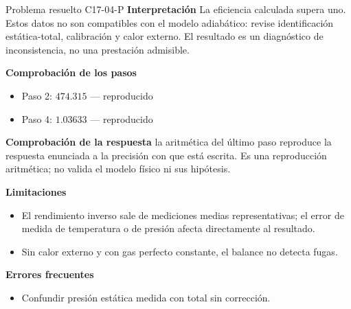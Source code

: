 \documentclass[10pt,openany]{book}
\begin{document}
\begin{studiumworked}{Problema resuelto C17-04-P}
\noindent\textbf{Interpretación}
La eficiencia calculada supera uno. Estos datos no son compatibles con el modelo adiabático: revise identificación estática-total, calibración y calor externo. El resultado es un diagnóstico de inconsistencia, no una prestación admisible.

\noindent\textbf{Comprobación de los pasos}
\begin{itemize}
\item Paso 2: $474.315$ — reproducido
\item Paso 4: $1.03633$ — reproducido
\end{itemize}

\noindent\textbf{Comprobación de la respuesta} la aritmética del último paso reproduce la respuesta enunciada a la precisión con que está escrita. Es una reproducción aritmética; no valida el modelo físico ni sus hipótesis.

\noindent\textbf{Limitaciones}
\begin{itemize}
\item El rendimiento inverso sale de mediciones medias representativas; el error de medida de temperatura o de presión afecta directamente al resultado.
\item Sin calor externo y con gas perfecto constante, el balance no detecta fugas.
\end{itemize}

\noindent\textbf{Errores frecuentes}
\begin{itemize}
\item Confundir presión estática medida con total sin corrección.
\end{itemize}
\end{studiumworked}
\end{document}
